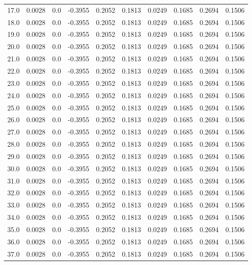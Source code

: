 \begin{longtable}{lrrrrrrrrr}
17.0 & 0.0028 & 0.0 & -0.3955 & 0.2052 & 0.1813 & 0.0249 & 0.1685 & 0.2694 & 0.1506 \\
18.0 & 0.0028 & 0.0 & -0.3955 & 0.2052 & 0.1813 & 0.0249 & 0.1685 & 0.2694 & 0.1506 \\
19.0 & 0.0028 & 0.0 & -0.3955 & 0.2052 & 0.1813 & 0.0249 & 0.1685 & 0.2694 & 0.1506 \\
20.0 & 0.0028 & 0.0 & -0.3955 & 0.2052 & 0.1813 & 0.0249 & 0.1685 & 0.2694 & 0.1506 \\
21.0 & 0.0028 & 0.0 & -0.3955 & 0.2052 & 0.1813 & 0.0249 & 0.1685 & 0.2694 & 0.1506 \\
22.0 & 0.0028 & 0.0 & -0.3955 & 0.2052 & 0.1813 & 0.0249 & 0.1685 & 0.2694 & 0.1506 \\
23.0 & 0.0028 & 0.0 & -0.3955 & 0.2052 & 0.1813 & 0.0249 & 0.1685 & 0.2694 & 0.1506 \\
24.0 & 0.0028 & 0.0 & -0.3955 & 0.2052 & 0.1813 & 0.0249 & 0.1685 & 0.2694 & 0.1506 \\
25.0 & 0.0028 & 0.0 & -0.3955 & 0.2052 & 0.1813 & 0.0249 & 0.1685 & 0.2694 & 0.1506 \\
26.0 & 0.0028 & 0.0 & -0.3955 & 0.2052 & 0.1813 & 0.0249 & 0.1685 & 0.2694 & 0.1506 \\
27.0 & 0.0028 & 0.0 & -0.3955 & 0.2052 & 0.1813 & 0.0249 & 0.1685 & 0.2694 & 0.1506 \\
28.0 & 0.0028 & 0.0 & -0.3955 & 0.2052 & 0.1813 & 0.0249 & 0.1685 & 0.2694 & 0.1506 \\
29.0 & 0.0028 & 0.0 & -0.3955 & 0.2052 & 0.1813 & 0.0249 & 0.1685 & 0.2694 & 0.1506 \\
30.0 & 0.0028 & 0.0 & -0.3955 & 0.2052 & 0.1813 & 0.0249 & 0.1685 & 0.2694 & 0.1506 \\
31.0 & 0.0028 & 0.0 & -0.3955 & 0.2052 & 0.1813 & 0.0249 & 0.1685 & 0.2694 & 0.1506 \\
32.0 & 0.0028 & 0.0 & -0.3955 & 0.2052 & 0.1813 & 0.0249 & 0.1685 & 0.2694 & 0.1506 \\
33.0 & 0.0028 & 0.0 & -0.3955 & 0.2052 & 0.1813 & 0.0249 & 0.1685 & 0.2694 & 0.1506 \\
34.0 & 0.0028 & 0.0 & -0.3955 & 0.2052 & 0.1813 & 0.0249 & 0.1685 & 0.2694 & 0.1506 \\
35.0 & 0.0028 & 0.0 & -0.3955 & 0.2052 & 0.1813 & 0.0249 & 0.1685 & 0.2694 & 0.1506 \\
36.0 & 0.0028 & 0.0 & -0.3955 & 0.2052 & 0.1813 & 0.0249 & 0.1685 & 0.2694 & 0.1506 \\
37.0 & 0.0028 & 0.0 & -0.3955 & 0.2052 & 0.1813 & 0.0249 & 0.1685 & 0.2694 & 0.1506 \\

\end{longtable}

